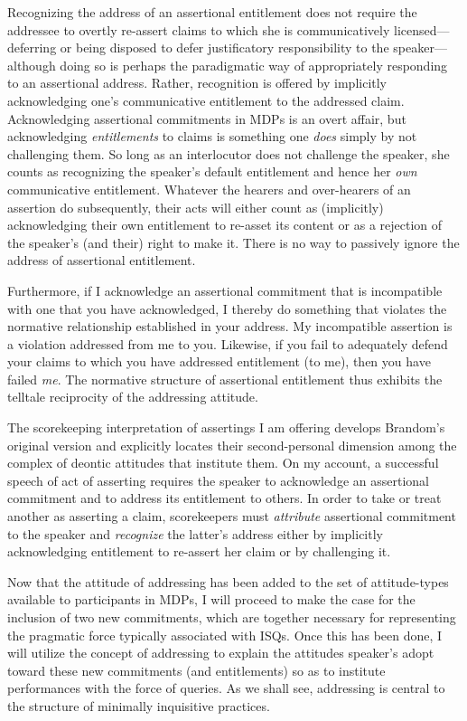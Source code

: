 \documentclass{article}                     %
\begin{document}
Recognizing the address of an assertional entitlement does not require
the addressee to overtly re-assert claims to which she is communicatively
licensed---deferring or being disposed to defer justificatory responsibility
to the speaker---although doing so is perhaps the paradigmatic way
of appropriately responding to an assertional address. Rather, recognition
is offered by implicitly acknowledging one's communicative entitlement
to the addressed claim. Acknowledging assertional commitments in MDPs
is an overt affair, but acknowledging \emph{entitlements} to claims
is something one \emph{does} simply by not challenging them. So long
as an interlocutor does not challenge the speaker, she counts as recognizing
the speaker's default entitlement and hence her \emph{own} communicative
entitlement. Whatever the hearers and over-hearers of an assertion
do subsequently, their acts will either count as (implicitly) acknowledging
their own entitlement to re-asset its content or as a rejection
of the speaker's (and their) right to make it. There is no way to
passively ignore the address of assertional entitlement.

Furthermore, if I acknowledge an assertional commitment that is incompatible
with one that you have acknowledged, I thereby do something that violates
the normative relationship established in your address. My incompatible
assertion is a violation addressed from me to you. Likewise, if you fail to adequately defend your claims to which you have addressed
entitlement (to me), then you have failed \emph{me}. The normative
structure of assertional entitlement thus exhibits the telltale reciprocity
of the addressing attitude.

The scorekeeping interpretation of assertings I am offering develops
Brandom's original version and explicitly locates their second-personal
dimension among the complex of deontic attitudes that institute them.
On my account, a successful speech of act of asserting requires the
speaker to acknowledge an assertional commitment and to address its
entitlement to others. In order to take or treat another as asserting
a claim, scorekeepers must \emph{attribute} assertional commitment
to the speaker and \emph{recognize} the latter's address either by
implicitly acknowledging entitlement to re-assert her claim or by
challenging it. 

Now that the attitude of addressing has been added to the set of attitude-types
available to participants in MDPs, I will proceed to make the case
for the inclusion of two new commitments, which are together necessary
for representing the pragmatic force typically associated with ISQs.
Once this has been done, I will utilize the concept of addressing
to explain the attitudes speaker's adopt toward these new commitments
(and entitlements) so as to institute performances with the force
of queries. As we shall see, addressing is central to the structure
of minimally inquisitive practices.
\end{document}
